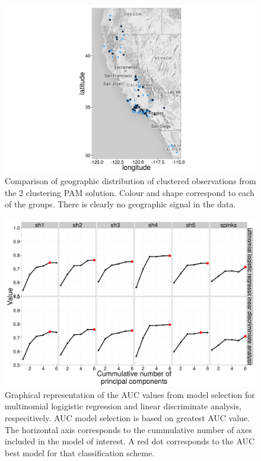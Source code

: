 \documentclass[12pt,letterpaper]{article}
\begin{document}
\begin{figure}[ht]
  \centering
  \includegraphics[height = \textheight, width = \textwidth, keepaspectratio = true]{figure/gap_map}
  \caption{Comparison of geographic distribution of clustered observations from the 2 clustering PAM solution. Colour and shape correspond to each of the groups. There is clearly no geographic signal in the data.}
  \label{fig:gap_map}
\end{figure}

\begin{figure}[ht]
  \centering
  \includegraphics[height = \textheight, width = \textwidth, keepaspectratio = true]{figure/sel_val}
  \caption{Graphical representation of the AUC values from model selection for multinomial logigistic regression and linear discriminate analysis, respecitively. AUC model selection is based on greatest AUC value. The horizontal axis corresponds to the cummulative number of axes included in the model of interest. A red dot corresponds to the AUC best model for that classification scheme.}
  \label{fig:sel}
\end{figure}
\end{document}
